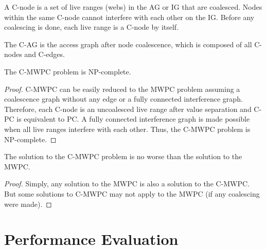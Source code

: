 \documentclass[prodmode,acmtecs]{acmsmall}
\begin{document}
\begin{definition}A C-node is a set of
live ranges (webs) in the AG or IG that are coalesced. Nodes within the same
C-node cannot interfere with each other on the IG. Before any coalescing is
done, each live range is a C-node by itself.
\end{definition}

\begin{definition}The C-AG is the access
graph after node coalescence, which is composed of all C-nodes and C-edges.
\end{definition}

\begin{lemma}
The C-MWPC problem is NP-complete.
\end{lemma}
\begin{proof} C-MWPC can be easily reduced to the MWPC problem assuming a
coalescence graph without any edge or a fully connected interference graph.
Therefore, each C-node is an uncoalesced live range after value separation
and C-PC is equivalent to PC. A fully connected interference graph is made
possible when all live ranges interfere with each other. Thus, the C-MWPC
problem is NP-complete.
\end{proof}

\begin{lemma}The solution to the C-MWPC problem is no
worse than the solution to the MWPC.
\end{lemma}
\begin{proof}
Simply, any solution to the MWPC is also a solution to the
C-MWPC. But some solutions to C-MWPC may not apply to the MWPC (if any
coalescing were made).
\end{proof}

\section{Performance Evaluation}
\end{document}
